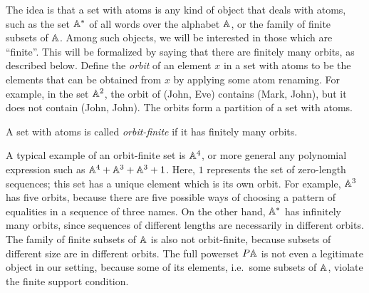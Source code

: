 The idea is that a set with atoms is any kind of object that deals with atoms, such as the set $\mathbb A^*$ of all words over the alphabet $\mathbb A$, or the family of finite subsets of $\mathbb A$. Among such objects, we will be interested in those which are ``finite''. This will be formalized by  saying that there are  finitely many orbits, as described below.
Define the \emph{orbit} of an element $x$ in a set with atoms to be the elements that can be obtained from $x$ by applying some atom renaming. For example, in the set $\mathbb A^2$,  the orbit of (John, Eve)   contains  (Mark, John), but it does not contain (John, John). The orbits form a partition of a set with atoms. 


\begin{definition}   A set with atoms is called \emph{orbit-finite} if it has finitely many orbits. 
\end{definition}

A typical example of an orbit-finite set is $\mathbb A^4$, or more general any polynomial expression such as $\mathbb A^4 + \mathbb A^3 + \mathbb A^3 + 1$. Here, $1$ represents the set of zero-length sequences; this set has a unique element which is its own orbit.  For  example,  $\mathbb A^3$ has five orbits, because there are five possible ways of choosing a pattern of equalities in a sequence of three names. On the other hand,  $\mathbb A^*$ has infinitely many orbits, since sequences of different lengths are necessarily in different orbits.   The family of finite subsets of $\mathbb A$  is also  not orbit-finite, because subsets of different size are in different orbits. The full powerset $\powerset \atoms$ is not even a legitimate object in our setting, because some of its elements, i.e.~some subsets of $\mathbb A$, violate the finite support condition. 

        
